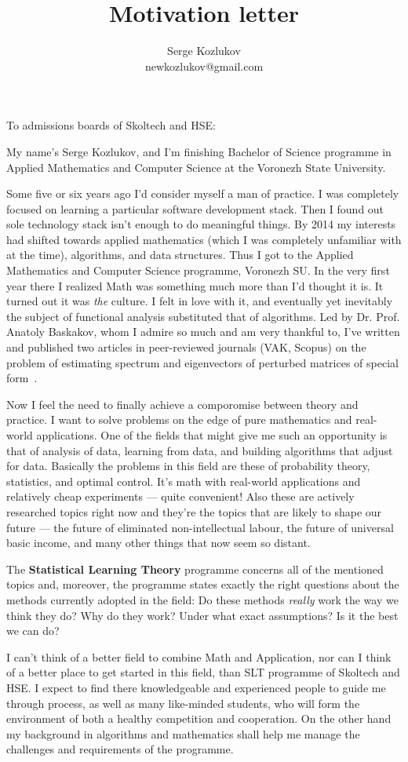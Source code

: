 \documentclass{article}
\title{Motivation letter}
\author{Serge Kozlukov\\
newkozlukov@gmail.com}
\begin{document}
\maketitle

To admissions boards of Skoltech and HSE:

My name's Serge Kozlukov, and I'm finishing Bachelor of Science programme in
Applied Mathematics and Computer Science at the Voronezh State University.

Some five or six years ago I'd consider myself a man of practice. I was
completely focused on learning a particular software development stack.
Then I found out sole technology stack isn't enough to do meaningful things.
By 2014 my interests had shifted towards applied mathematics (which I was
completely unfamiliar with at the time), algorithms, and data structures.
Thus I got to the Applied Mathematics and Computer Science programme, Voronezh
SU. In the very first year there I realized Math was something much more than
I'd thought it is. It turned out it was \emph{the} culture. I felt in love with
it, and eventually yet inevitably the subject of functional analysis substituted
that of algorithms. Led by Dr. Prof. Anatoly Baskakov, whom I admire so much and
am very thankful to,
I've written and published two articles in peer-reviewed journals (VAK, Scopus)
on the problem of estimating spectrum and eigenvectors of perturbed matrices of
special form~\cite{Koz17,Koz18}.

Now I feel the need to finally achieve a comporomise between theory and
practice. I want to solve problems on the edge of pure mathematics and
real-world applications. One of the fields that might give me such an opportunity
is that of analysis of data, learning from data, and building algorithms that
adjust for data. Basically the problems in this field are these of
probability theory, statistics, and optimal control. It's math with real-world
applications and relatively cheap experiments --- quite convenient!
Also these are actively researched topics right now and they're the
topics that are likely to shape our future --- the future of eliminated
non-intellectual labour, the future of universal basic income, and many other
things that now seem so distant.

The \textbf{Statistical Learning Theory} programme concerns all of the mentioned
topics and, moreover, the programme states exactly the right questions about the
methods currently adopted in the field: Do these methods \emph{really} work the
way we think they do? Why do they work? Under what exact assumptions? Is it the
best we can do?

I can't think of a better field to combine Math and Application,
nor can I think of a better place to get started in this field, than SLT
programme of Skoltech and HSE. I expect to find there knowledgeable and
experienced people to guide me through process, as well as many like-minded
students, who will form the environment of both a healthy competition and
cooperation. On the other hand my background in algorithms and mathematics shall
help me manage the challenges and requirements of the programme.

\printbibliography
\end{document}
